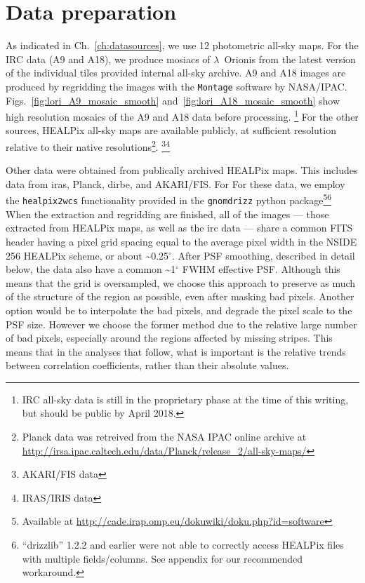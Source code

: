 	\section{Data preparation}
    \label{sec:dataprocessing}
		As indicated in Ch.~\ref{ch:datasources}, we use 12 photometric all-sky maps. For the IRC data (A9 and A18), we produce mosiacs of $\lambda$~Orionis from the latest version of the individual tiles provided internal all-sky archive. A9 and A18 images are produced by regridding the images with the {\tt Montage} software by NASA/IPAC. Figs.~\ref{fig:lori_A9_mosaic_smooth} and~\ref{fig:lori_A18_mosaic_smooth} show high resolution mosaics of the A9 and A18 data before processing.
      \footnote{IRC all-sky data is still in the proprietary phase at the time of this writing, but should be public by April 2018.}
       For the other sources, HEALPix all-sky maps are available publicly, at sufficient resolution relative to their native resolutions\footnote{Planck data was retreived from the NASA IPAC online archive at \url{http://irsa.ipac.caltech.edu/data/Planck/release_2/all-sky-maps/}}. \footnote{AKARI/FIS data }\footnote{IRAS/IRIS data }

		  Other data were obtained from publically archived HEALPix maps. This includes data from \acrshort{iras}, Planck, \acrshort{dirbe}, and AKARI/FIS. For For these data, we employ the {\tt healpix2wcs} functionality provided in the {\tt gnomdrizz} python package\footnote{Available at \url{http://cade.irap.omp.eu/dokuwiki/doku.php?id=software}}\footnote{``drizzlib'' 1.2.2 and earlier were not able to correctly access HEALPix files with multiple fields/columns. See appendix for our recommended workaround.}   When the extraction and regridding are finished, all of the images --- those extracted from HEALPix maps, as well as the \acrshort{irc} data --- share a common FITS header having a pixel grid spacing equal to the average pixel width in the NSIDE 256 HEALPix scheme, or about \textasciitilde{0.25$^{\circ{}}$}. After PSF smoothing, described in detail below, the data also have a common \textasciitilde{1$^{\circ{}}$} FWHM effective PSF. Although this means that the grid is oversampled, we choose this approach to preserve as much of the structure of the region as possible, even after masking bad pixels. Another option would be to interpolate the bad pixels, and degrade the pixel scale to the PSF size. However we choose the former method due to the relative large number of bad pixels, especially around the regions affected by missing stripes. This means that in the analyses that follow, what is important is the relative trends between correlation coefficients, rather than their absolute values.

